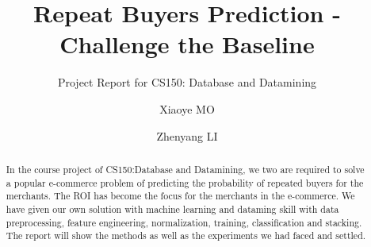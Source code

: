 \documentclass[sigconf]{acmart}
\begin{document}
\title{Repeat Buyers Prediction - Challenge the Baseline}
\subtitle{Project Report for CS150: Database and Datamining}


\author{Xiaoye MO}

\author{Zhenyang LI}



\begin{abstract}
In the course project of CS150:Database and Datamining, we two are required to solve a popular e-commerce problem of predicting the probability of repeated buyers for the merchants. The ROI has become the focus for the merchants in the e-commerce. We have given our own solution with machine learning and dataming skill with data preprocessing, feature engineering, normalization, training, classification and stacking. The report will show the methods as well as the experiments we had faced and settled. 
\end{abstract}


\maketitle
\end{document}
